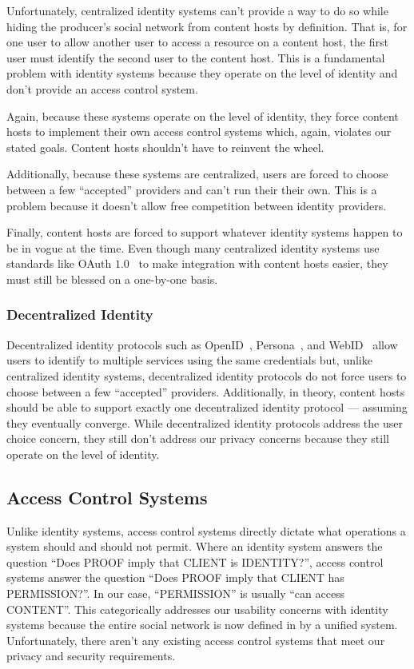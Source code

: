 \documentclass[pdftex,12pt,a4papaer,twoside,notitlepage]{report}
\begin{document}
Unfortunately, centralized identity systems can't provide a way to do so while
hiding the producer's social network from content hosts by definition. That is,
for one user to allow another user to access a resource on a content host, the
first user must identify the second user to the content host. This is a
fundamental problem with identity systems because they operate on the level of
identity and don't provide an access control system.

Again, because these systems operate on the level of identity, they force
content hosts to implement their own access control systems which, again,
violates our stated goals. Content hosts shouldn't have to reinvent the wheel.

Additionally, because these systems are centralized, users are forced to choose
between a few ``accepted'' providers and can't run their their own. This is a
problem because it doesn't allow free competition between identity providers.

Finally, content hosts are forced to support whatever identity systems happen to
be in vogue at the time. Even though many centralized identity systems use
standards like OAuth $1.0$~\cite{oauth} to make integration with content hosts
easier, they must still be blessed on a one-by-one basis.

\subsubsection{Decentralized Identity}

Decentralized identity protocols such as OpenID~\cite{openid},
Persona~\cite{persona}, and WebID~\cite{webid} allow users to identify to
multiple services using the same credentials but, unlike centralized identity
systems, decentralized identity protocols do not force users to choose between a
few ``accepted'' providers. Additionally, in theory, content hosts should be
able to support exactly one decentralized identity protocol --- assuming they
eventually converge. While decentralized identity protocols address the user
choice concern, they still don't address our privacy concerns because they still
operate on the level of identity.

\subsection{Access Control Systems}

Unlike identity systems, access control systems directly dictate what operations
a system should and should not permit. Where an identity system answers the
question ``Does PROOF imply that CLIENT is IDENTITY?'', access control systems
answer the question ``Does PROOF imply that CLIENT has PERMISSION?''. In our
case, ``PERMISSION'' is usually ``can access CONTENT''. This categorically
addresses our usability concerns with identity systems because the entire social
network is now defined in by a unified system. Unfortunately, there aren't any
existing access control systems that meet our privacy and security requirements.
\end{document}
